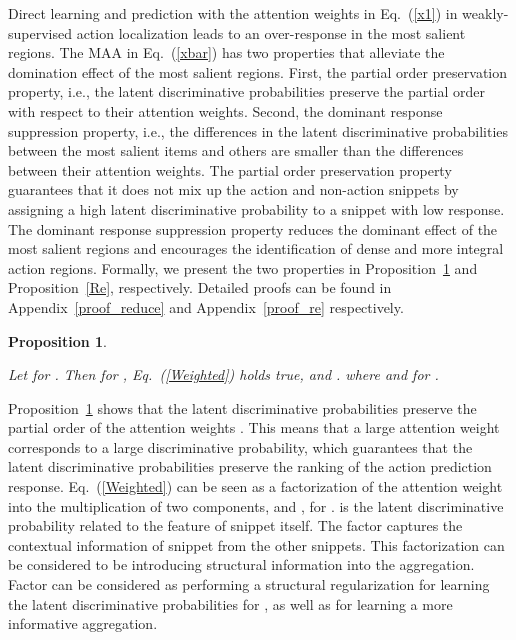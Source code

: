 \documentclass{article} \usepackage{iclr2019_conference,times}
\newtheorem{proposition}{Proposition}
\begin{document}
Direct learning and prediction with the attention weights  in Eq.~(\ref{x1}) in weakly-supervised action localization leads to an over-response in the most salient regions.
The MAA in Eq.~(\ref{xbar}) has two properties that alleviate the domination effect of the most salient regions. First, the partial order preservation property, i.e., the latent discriminative probabilities preserve the partial order with respect to their attention weights. Second, the dominant response suppression property, i.e., the differences in the latent discriminative probabilities between the most salient items and others are smaller than the differences between their attention weights. The partial order preservation property guarantees that it does not mix up the action and non-action snippets by assigning a high latent discriminative probability to a snippet with low response. The dominant response suppression property reduces the dominant effect of the most salient regions and encourages the identification of dense and more integral action regions. Formally, we present the two properties in Proposition~\ref{Reduce} and Proposition~\ref{Re}, respectively. Detailed proofs can be found in Appendix~\ref{proof_reduce} and Appendix~\ref{proof_re} respectively. 






\begin{proposition}
\label{Reduce}

Let    for . Then for , Eq.~(\ref{Weighted}) holds true, and .  
where  and  for .

\end{proposition}
Proposition~\ref{Reduce} shows that the latent discriminative probabilities  preserve the partial order of the attention weights . This means that a large attention weight corresponds to a large discriminative probability, which guarantees that the latent discriminative probabilities preserve the ranking of the action prediction response.
Eq.~(\ref{Weighted}) can be seen as a factorization of the attention weight  into the multiplication of two components,  and , for .  is the latent discriminative probability related to the feature of snippet  itself. The factor  captures the contextual information of snippet  from the other snippets. This factorization can be considered to be introducing structural information into the aggregation. Factor  can be considered as performing a structural regularization for learning the latent discriminative probabilities  for , as well as for learning a more informative aggregation. 
\end{document}
